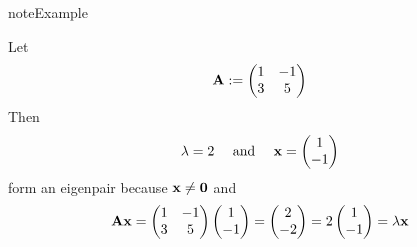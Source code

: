 \documentclass[letterpaper,10pt,english]{jupyterBook}
\begin{document}
\begin{sphinxadmonition}{note}{Example}

\sphinxAtStartPar
Let
\begin{equation*}
\begin{split}
%
{\bf A} :=
\begin{pmatrix}
1 & -1 \\
3 & 5
\end{pmatrix}
%
\end{split}
\end{equation*}
\sphinxAtStartPar
Then
\begin{equation*}
\begin{split}
%
\lambda = 2 
\quad \text{ and } \quad
{\bf x}
=
\begin{pmatrix}
1 \\
-1
\end{pmatrix}
%
\end{split}
\end{equation*}
\sphinxAtStartPar
form an eigenpair because \({\bf x} \ne {\bf 0}\) and
\begin{equation*}
\begin{split}
%
{\bf A} {\bf x} =
\begin{pmatrix}
1 & -1 \\
3 & 5
\end{pmatrix}
\begin{pmatrix}
1 \\
-1
\end{pmatrix}
=
\begin{pmatrix}
2 \\
-2
\end{pmatrix}
= 2
\begin{pmatrix}
1 \\
-1
\end{pmatrix}
=
\lambda {\bf x} 
%
\end{split}
\end{equation*}\end{sphinxadmonition}
\end{document}
